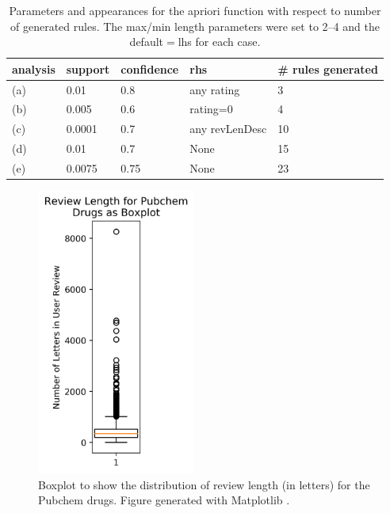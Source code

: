 \documentclass[11pt]{article}
\begin{document}
\begin{table}[H]
\centering
\begin{tabular}{lllll}
\toprule
\textbf{analysis} & \textbf{support} & \textbf{confidence} & \textbf{rhs}   & \textbf{\# rules generated} \\
\midrule
(a)               & 0.01             & 0.8                 & any rating     & 3                           \\
(b)               & 0.005            & 0.6                 & rating=0       & 4                           \\
(c)               & 0.0001           & 0.7                 & any revLenDesc & 10                          \\
(d)               & 0.01             & 0.7                 & None           & 15                          \\
(e)               & 0.0075           & 0.75                & None           & 23      \\
\bottomrule
\end{tabular}
\caption{Parameters and appearances for the apriori function with respect to number of generated rules. The max/min length parameters were set to 2--4 and the default$=$lhs for each case.}
\label{table-arules-params}
\end{table}

\newpage

\begin{figure}
\includegraphics[width=5.2cm]{boxplot_revlen.png}
\caption{Boxplot to show the distribution of review length (in letters) for the Pubchem drugs. Figure generated with Matplotlib \cite{matplotlib}.}
\label{revlen-boxplot}
\end{figure}
\end{document}
